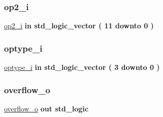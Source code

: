 \mbox{\label{classalu_ae346648ed4ed2217b5e8d668b165aff2}} 
\subsubsection{\texorpdfstring{op2\+\_\+i}{op2\_i}}
{\footnotesize\ttfamily \hyperlink{classalu_ae346648ed4ed2217b5e8d668b165aff2}{op2\+\_\+i} {\bfseries \textcolor{keywordflow}{in}\textcolor{vhdlchar}{ }} {\bfseries \textcolor{comment}{std\+\_\+logic\+\_\+vector}\textcolor{vhdlchar}{ }\textcolor{vhdlchar}{(}\textcolor{vhdlchar}{ }\textcolor{vhdlchar}{ } \textcolor{vhdldigit}{11} \textcolor{vhdlchar}{ }\textcolor{keywordflow}{downto}\textcolor{vhdlchar}{ }\textcolor{vhdlchar}{ } \textcolor{vhdldigit}{0} \textcolor{vhdlchar}{ }\textcolor{vhdlchar}{)}\textcolor{vhdlchar}{ }} \hspace{0.3cm}{\ttfamily [Port]}}

\mbox{\label{classalu_aee662ea38c86cd2e7dc1970ce8a6d5e9}} 
\subsubsection{\texorpdfstring{optype\+\_\+i}{optype\_i}}
{\footnotesize\ttfamily \hyperlink{classalu_aee662ea38c86cd2e7dc1970ce8a6d5e9}{optype\+\_\+i} {\bfseries \textcolor{keywordflow}{in}\textcolor{vhdlchar}{ }} {\bfseries \textcolor{comment}{std\+\_\+logic\+\_\+vector}\textcolor{vhdlchar}{ }\textcolor{vhdlchar}{(}\textcolor{vhdlchar}{ }\textcolor{vhdlchar}{ } \textcolor{vhdldigit}{3} \textcolor{vhdlchar}{ }\textcolor{keywordflow}{downto}\textcolor{vhdlchar}{ }\textcolor{vhdlchar}{ } \textcolor{vhdldigit}{0} \textcolor{vhdlchar}{ }\textcolor{vhdlchar}{)}\textcolor{vhdlchar}{ }} \hspace{0.3cm}{\ttfamily [Port]}}

\mbox{\label{classalu_a7771d7a30216542931475a12593b972c}} 
\subsubsection{\texorpdfstring{overflow\+\_\+o}{overflow\_o}}
{\footnotesize\ttfamily \hyperlink{classalu_a7771d7a30216542931475a12593b972c}{overflow\+\_\+o} {\bfseries \textcolor{keywordflow}{out}\textcolor{vhdlchar}{ }} {\bfseries \textcolor{comment}{std\+\_\+logic}\textcolor{vhdlchar}{ }} \hspace{0.3cm}{\ttfamily [Port]}}

